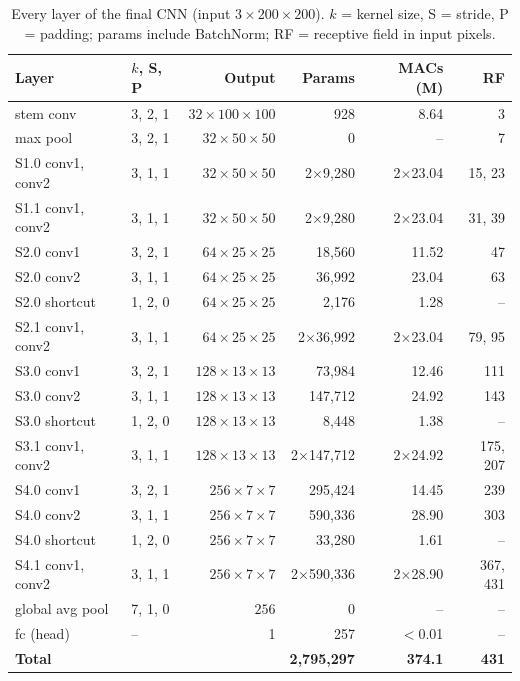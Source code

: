\documentclass[conference,a4paper]{IEEEtran}
\begin{document}
\begin{table}[t]
\caption{Every layer of the final CNN (input $3\times200\times200$). $k$ = kernel size, S = stride, P = padding; params include BatchNorm; RF = receptive field in input pixels.}
\label{tab:layers}
\centering\scriptsize
\setlength{\tabcolsep}{3pt}
\begin{tabular}{@{}llrrrr@{}}
\toprule
Layer & $k$, S, P & Output & Params & MACs (M) & RF \\
\midrule
stem conv & 3, 2, 1 & $32\times100\times100$ & 928 & 8.64 & 3 \\
max pool & 3, 2, 1 & $32\times50\times50$ & 0 & -- & 7 \\
S1.0 conv1, conv2 & 3, 1, 1 & $32\times50\times50$ & 2$\times$9{,}280 & 2$\times$23.04 & 15, 23 \\
S1.1 conv1, conv2 & 3, 1, 1 & $32\times50\times50$ & 2$\times$9{,}280 & 2$\times$23.04 & 31, 39 \\
S2.0 conv1 & 3, 2, 1 & $64\times25\times25$ & 18{,}560 & 11.52 & 47 \\
S2.0 conv2 & 3, 1, 1 & $64\times25\times25$ & 36{,}992 & 23.04 & 63 \\
S2.0 shortcut & 1, 2, 0 & $64\times25\times25$ & 2{,}176 & 1.28 & -- \\
S2.1 conv1, conv2 & 3, 1, 1 & $64\times25\times25$ & 2$\times$36{,}992 & 2$\times$23.04 & 79, 95 \\
S3.0 conv1 & 3, 2, 1 & $128\times13\times13$ & 73{,}984 & 12.46 & 111 \\
S3.0 conv2 & 3, 1, 1 & $128\times13\times13$ & 147{,}712 & 24.92 & 143 \\
S3.0 shortcut & 1, 2, 0 & $128\times13\times13$ & 8{,}448 & 1.38 & -- \\
S3.1 conv1, conv2 & 3, 1, 1 & $128\times13\times13$ & 2$\times$147{,}712 & 2$\times$24.92 & 175, 207 \\
S4.0 conv1 & 3, 2, 1 & $256\times7\times7$ & 295{,}424 & 14.45 & 239 \\
S4.0 conv2 & 3, 1, 1 & $256\times7\times7$ & 590{,}336 & 28.90 & 303 \\
S4.0 shortcut & 1, 2, 0 & $256\times7\times7$ & 33{,}280 & 1.61 & -- \\
S4.1 conv1, conv2 & 3, 1, 1 & $256\times7\times7$ & 2$\times$590{,}336 & 2$\times$28.90 & 367, 431 \\
global avg pool & 7, 1, 0 & $256$ & 0 & -- & -- \\
fc (head) & -- & 1 & 257 & $<$0.01 & -- \\
\midrule
\textbf{Total} & & & \textbf{2{,}795{,}297} & \textbf{374.1} & \textbf{431} \\
\bottomrule
\end{tabular}
\end{table}
\end{document}
